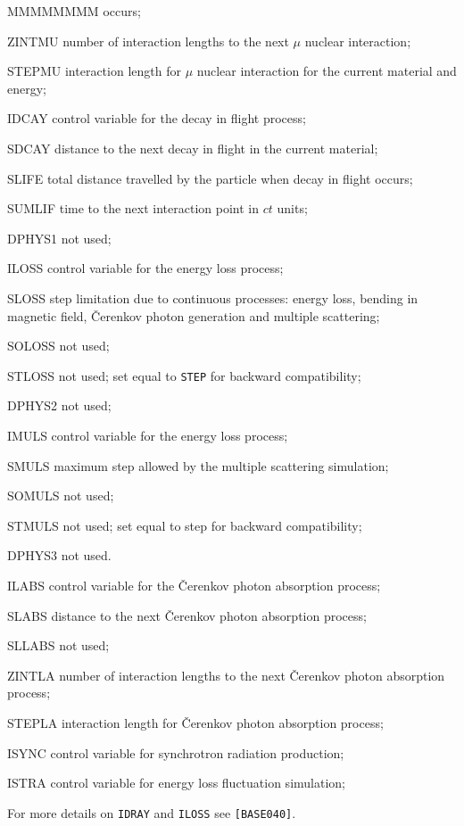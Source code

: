 \begin{DLtt}{MMMMMMMM}
occurs;
\item[ZINTMU] number of interaction lengths to the next $\mu$ nuclear interaction;
\item[STEPMU] interaction length for $\mu$ nuclear interaction for the current 
material and energy;
\item[IDCAY] control variable for the decay in flight process;
\item[SDCAY] distance to the next decay in flight in the current material;
\item[SLIFE] total distance travelled by the particle when decay in flight occurs;
\item[SUMLIF] time to the next interaction point in $ct$ units;
\item[DPHYS1] not used;
\item[ILOSS] control variable for the energy loss process;
\item[SLOSS] step limitation due to continuous processes: energy loss,
bending in magnetic field, \v{C}erenkov photon generation and multiple 
scattering;
\item[SOLOSS] not used;
\item[STLOSS] not used; set equal to {\tt STEP} for backward compatibility;
\item[DPHYS2] not used;
\item[IMULS] control variable for the energy loss process;
\item[SMULS] maximum step allowed by the multiple scattering simulation;
\item[SOMULS] not used;
\item[STMULS] not used; set equal to step for backward compatibility;
\item[DPHYS3] not used.
\item[ILABS] control variable for the \v{C}erenkov photon absorption process;
\item[SLABS] distance to the next \v{C}erenkov photon absorption process;
\item[SLLABS] not used;
\item[ZINTLA] number of interaction lengths to the next \v{C}erenkov 
photon absorption process;
\item[STEPLA] interaction length for \v{C}erenkov 
photon absorption process;
\item[ISYNC] control variable for synchrotron radiation production;
\item[ISTRA] control variable for energy loss fluctuation simulation;
\end{DLtt}
For more details on {\tt IDRAY} and {\tt ILOSS} see {\tt [BASE040]}.
